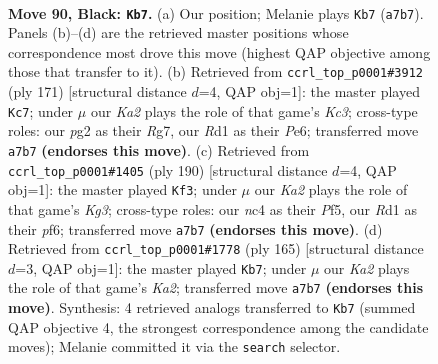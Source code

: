 \documentclass[11pt]{article}
\begin{document}
\clearpage

\begin{figure}[p]\centering
\begin{subfigure}{0.46\textwidth}\centering
\resizebox{\linewidth}{!}{%
\newchessgame
\chessboard[
  setfen={8/k7/7R/5K2/2N5/8/6P1/3r4 b - - 45 90},
  showmover=false,
  pgfstyle=straightmove, color=movearrow, markmove={a7-b7}
]}
\caption{}
\end{subfigure}\hfill
\begin{subfigure}{0.46\textwidth}\centering
\resizebox{\linewidth}{!}{%
\newchessgame
\chessboard[
  setfen={3R4/6r1/2k1p3/8/5P2/8/2K5/8 b - - 0 86},
  showmover=false,
  pgfstyle=straightmove, color=movearrow, markmove={c6-c7}
]}
\caption{}
\end{subfigure}
\\[4pt]
\begin{subfigure}{0.46\textwidth}\centering
\resizebox{\linewidth}{!}{%
\newchessgame
\chessboard[
  setfen={8/R7/5p1k/5P2/1r6/6K1/8/8 w - - 4 96},
  showmover=false,
  pgfstyle=straightmove, color=movearrow, markmove={g3-f3}
]}
\caption{}
\end{subfigure}\hfill
\begin{subfigure}{0.46\textwidth}\centering
\resizebox{\linewidth}{!}{%
\newchessgame
\chessboard[
  setfen={8/k7/7R/p7/4N3/8/6r1/4K3 b - - 15 83},
  showmover=false,
  pgfstyle=straightmove, color=movearrow, markmove={a7-b7}
]}
\caption{}
\end{subfigure}
\caption{\textbf{Move 90, Black: \texttt{Kb7}.} (a) Our position; Melanie plays \texttt{Kb7} (\texttt{a7b7}). Panels (b)--(d) are the retrieved master positions whose correspondence most drove this move (highest QAP objective among those that transfer to it). (b) Retrieved from \texttt{ccrl\_top\_p0001\#3912} (ply 171) [structural distance $d$=4, QAP obj=1]: the master played \texttt{Kc7}; under $\mu$ our \emph{Ka2} plays the role of that game's \emph{Kc3}; cross-type roles: our \emph{p}g2 as their \emph{R}g7, our \emph{R}d1 as their \emph{P}e6; transferred move \texttt{a7b7} \textbf{(endorses this move)}. (c) Retrieved from \texttt{ccrl\_top\_p0001\#1405} (ply 190) [structural distance $d$=4, QAP obj=1]: the master played \texttt{Kf3}; under $\mu$ our \emph{Ka2} plays the role of that game's \emph{Kg3}; cross-type roles: our \emph{n}c4 as their \emph{P}f5, our \emph{R}d1 as their \emph{p}f6; transferred move \texttt{a7b7} \textbf{(endorses this move)}. (d) Retrieved from \texttt{ccrl\_top\_p0001\#1778} (ply 165) [structural distance $d$=3, QAP obj=1]: the master played \texttt{Kb7}; under $\mu$ our \emph{Ka2} plays the role of that game's \emph{Ka2}; transferred move \texttt{a7b7} \textbf{(endorses this move)}. Synthesis: 4 retrieved analogs transferred to \texttt{Kb7} (summed QAP objective 4, the strongest correspondence among the candidate moves); Melanie committed it via the \texttt{search} selector.}
\label{fig:thought-m179}
\end{figure}
\end{document}
